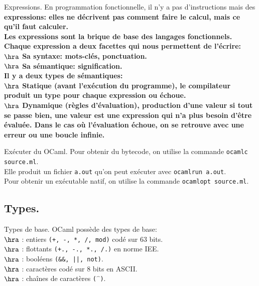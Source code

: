 \documentclass[french, 11pt]{article}
\begin{document}
\begin{defi}{Expressions.}{}
    En programmation fonctionnelle, il n'y a pas d'instructions mais des \bf{expressions}: elles ne décrivent pas comment faire le calcul, mais ce qu'il faut calculer.\\
    Les expressions sont la brique de base des langages fonctionnels. Chaque expression a deux facettes qui nous permettent de l'écrire:\\
    $\hra$ Sa syntaxe: mots-clés, ponctuation.\\
    $\hra$ Sa sémantique: signification.\\
    Il y a deux types de sémantiques:\\
    $\hra$ Statique (avant l'exécution du programme), le compilateur produit un type pour chaque expression ou échoue.\\
    $\hra$ Dynamique (règles d'évaluation), production d'une valeur si tout se passe bien, une valeur est une expression qui n'a plus besoin d'être évaluée.\n
    Dans le cas où l'évaluation échoue, on se retrouve avec une erreur ou une boucle infinie.
\end{defi}

\begin{defi}{Exécuter du OCaml.}{}
    Pour obtenir du bytecode, on utilise la commande \texttt{ocamlc source.ml}.\\
    Elle produit un fichier \texttt{a.out} qu'on peut exécuter avec \texttt{ocamlrun a.out}.\\
    Pour obtenir un exécutable natif, on utilise la commande \texttt{ocamlopt source.ml}.
\end{defi}

\subsection{Types.}

\begin{defi}{Types de base.}{}
    OCaml possède des types de base:\\
    $\hra$  : entiers \texttt{(+, -, *, /, mod)} codé sur 63 bits.\\
    $\hra$  : flottants \texttt{(+., -., *., /.)} en norme IEE.\\
    $\hra$  : booléens \texttt{(\&\&, ||, not)}.\\
    $\hra$  : caractères codé sur 8 bits en ASCII.\\
    $\hra$  : chaînes de caractères \texttt{($\hat{\phantom{a}}$)}.
\end{defi}
\end{document}
